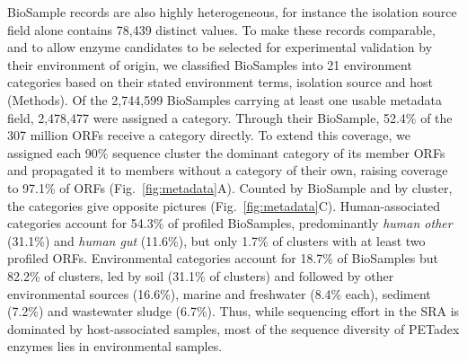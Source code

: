 \documentclass[pdflatex,sn-nature,iicol]{sn-jnl}%
\begin{document}
BioSample records are also highly heterogeneous, for instance the isolation source field alone contains 78,439 distinct values. To make these records comparable, and to allow enzyme candidates to be selected for experimental validation by their environment of origin, we classified BioSamples into 21 environment categories based on their stated environment terms, isolation source and host (Methods). Of the 2,744,599 BioSamples carrying at least one usable metadata field, 2,478,477 were assigned a category. Through their BioSample, 52.4\% of the 307 million ORFs receive a category directly. To extend this coverage, we assigned each 90\% sequence cluster the dominant category of its member ORFs and propagated it to members without a category of their own, raising coverage to 97.1\% of ORFs (Fig.~\ref{fig:metadata}A). Counted by BioSample and by cluster, the categories give opposite pictures (Fig.~\ref{fig:metadata}C). Human-associated categories account for 54.3\% of profiled BioSamples, predominantly \textit{human other} (31.1\%) and \textit{human gut} (11.6\%), but only 1.7\% of clusters with at least two profiled ORFs. Environmental categories account for 18.7\% of BioSamples but 82.2\% of clusters, led by soil (31.1\% of clusters) and followed by other environmental sources (16.6\%), marine and freshwater (8.4\% each), sediment (7.2\%) and wastewater sludge (6.7\%). Thus, while sequencing effort in the SRA is dominated by host-associated samples, most of the sequence diversity of PETadex enzymes lies in environmental samples.
\end{document}
